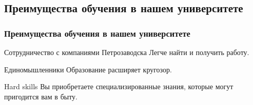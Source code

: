 \subsection{Преимущества обучения в нашем университете}

\begin{frame}
	\frametitle{Преимущества обучения в нашем университете}
	
	\begin{block}{Сотрудничество с компаниями Петрозаводска}
		Легче найти и получить работу.
	\end{block}
	
	\begin{exampleblock}{Единомышленники}
		Образование расширяет кругозор.
	\end{exampleblock}
	
	\begin{alertblock}{Hard skills}
		Вы приобретаете специализированные знания, которые могут пригодится вам в быту.
	\end{alertblock}
	
\end{frame}